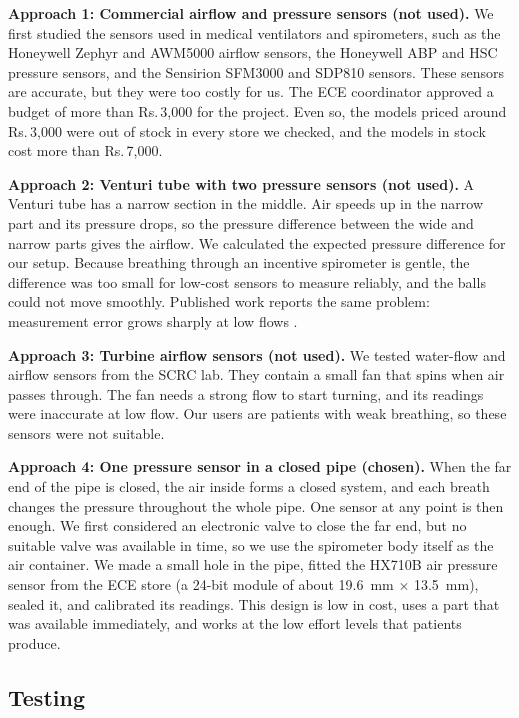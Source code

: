 \documentclass[12pt,a4paper]{article}
\newcommand{\rupee}{Rs.\,}              %
\begin{document}
\textbf{Approach 1: Commercial airflow and pressure sensors (not used).} We first studied the sensors used in medical ventilators and spirometers, such as the Honeywell Zephyr and AWM5000 airflow sensors, the Honeywell ABP and HSC pressure sensors, and the Sensirion SFM3000 and SDP810 sensors. These sensors are accurate, but they were too costly for us. The ECE coordinator approved a budget of more than \rupee 3,000 for the project. Even so, the models priced around \rupee 3,000 were out of stock in every store we checked, and the models in stock cost more than \rupee 7,000.

\textbf{Approach 2: Venturi tube with two pressure sensors (not used).} A Venturi tube has a narrow section in the middle. Air speeds up in the narrow part and its pressure drops, so the pressure difference between the wide and narrow parts gives the airflow. We calculated the expected pressure difference for our setup. Because breathing through an incentive spirometer is gentle, the difference was too small for low-cost sensors to measure reliably, and the balls could not move smoothly. Published work reports the same problem: measurement error grows sharply at low flows \cite{edmunds}.

\textbf{Approach 3: Turbine airflow sensors (not used).} We tested water-flow and airflow sensors from the SCRC lab. They contain a small fan that spins when air passes through. The fan needs a strong flow to start turning, and its readings were inaccurate at low flow. Our users are patients with weak breathing, so these sensors were not suitable.

\textbf{Approach 4: One pressure sensor in a closed pipe (chosen).} When the far end of the pipe is closed, the air inside forms a closed system, and each breath changes the pressure throughout the whole pipe. One sensor at any point is then enough. We first considered an electronic valve to close the far end, but no suitable valve was available in time, so we use the spirometer body itself as the air container. We made a small hole in the pipe, fitted the HX710B air pressure sensor from the ECE store (a 24-bit module of about 19.6~mm $\times$ 13.5~mm), sealed it, and calibrated its readings. This design is low in cost, uses a part that was available immediately, and works at the low effort levels that patients produce.

\subsection{Testing}
\label{sec:testing}
\end{document}
